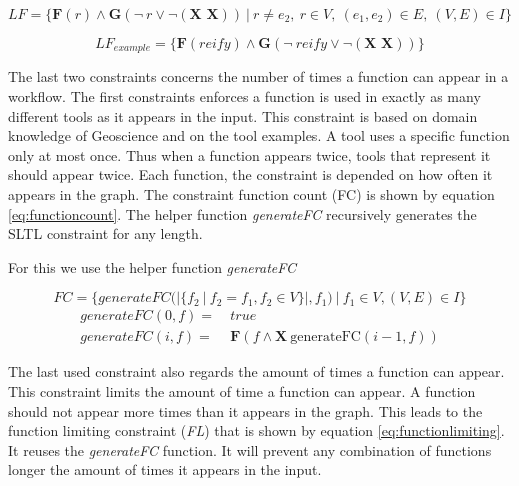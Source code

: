 \documentclass{article}
\begin{document}
\begin{equation}
    LF = \{ \textbf{F} (r) \wedge \textbf{G} ( \neg\ r \vee \neg (\textbf{X X})) \ |\ r \not = e_2,\ r \in V,\ (e_1, e_2) \in E,\  (V,E) \in  I
    \}
    \label{eq:lastfunction}
\end{equation}

\begin{equation*}
    LF_{example} = \{ \textbf{F} (reify) \wedge \textbf{G} ( \neg\ reify \vee \neg (\textbf{X X})) \}
\end{equation*}

The last two constraints concerns the number of times a function can appear in a workflow. The first constraints enforces a function is used in exactly as many different tools as it appears in the input. This constraint is based on domain knowledge of Geoscience and on the tool examples. A tool uses a specific function only at most once. Thus when a function appears twice, tools that represent it should appear twice. Each function, the constraint is depended on how often it appears in the graph. The constraint function count (FC) is shown by equation \ref{eq:functioncount}. The helper function \textit{ generateFC} recursively generates the SLTL constraint for any length. 

For this we use the helper function \textit{generateFC} 

\begin{equation}
    FC = \{   generateFC(|\{ f_2\ |\ f_2 = f_1, f_2 \in V \}|, f_1)\ |\ f_1 \in V, (V,E) \in  I \} \label{eq:functioncount}
\end{equation}
\begin{align*}
    generateFC(0,f) =&\ true \\
    generateFC(i,f) =&\ \textbf{F}(f \wedge \textbf{X}\ \text{generateFC}(i-1,f))
\end{align*}

The last used constraint also regards the amount of times a function can appear. This constraint limits the amount of time a function can appear. A function should not appear more times than it appears in the graph. This leads to the function limiting constraint (\textit{FL}) that is shown by equation \ref{eq:functionlimiting}. It reuses the \textit{generateFC} function. It will prevent any combination of functions longer the amount of times it appears in the input.
\end{document}
